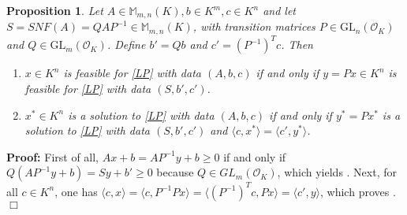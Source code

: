 \documentclass[a4paper,12pt]{article}
\newenvironment{proof}{\hbox{}\vspace{-0.8cm} {\bf Proof:}}{\hfill $\Box$}
\newtheorem{proposition}{Proposition}
\newcommand{\allmat}{\mathbb{M}} %
\newcommand{\simone}[1]{{\color{blue} #1}} %
\newcommand{\corentin}[1]{{\color{red} #1}} %
\DeclareMathOperator{\val}{val}
\newcommand{\OK}{\mathcal{O}_K}
\def\diag{\mathrm{diag}}
\newcommand{\GL}{\mathrm{GL}}
\begin{document}


\begin{proposition} \label{solsLP}
  Let $A \in \allmat_{m,n}(K), b \in K^m, c\in K^n$ and let $S = SNF(A) = QAP^{-1} \in \allmat_{m,n}(K)$, with
  transition matrices $P \in \GL_n(\OK)$ and $Q\in \GL_m(\OK)$. Define $b' = Qb$ and $c' = (P^{-1})^Tc$.
  Then
   \begin{enumerate}
   \item \label{solsLP_item1}
     $x \in K^n$ is feasible for \eqref{LP} with data $(A,b,c)$ if and only if $y = P x \in K^n$ is
     feasible for \eqref{LP} with data $(S,b',c')$.
   \item \label{solsLP_item2}
     $x^* \in K^n$ is a solution to \eqref{LP} with data $(A,b,c)$ if and only if $y^* = P x^*$ is
     a solution to \eqref{LP} with data $(S,b',c')$ and $\langle c,x^* \rangle = \langle c',y^* \rangle$.
   \end{enumerate}
\end{proposition}
\begin{proof}
  First of all, $Ax+b = AP^{-1}y +b \geq 0$ if and only if $Q(AP^{-1}y + b) = Sy + b' \geq 0$ because
  $Q \in GL_m(\OK)$, which yields . Next, for all $c \in K^n$, one has $\langle c,
  x\rangle = \langle c, P^{-1}Px \rangle = \langle \left(P^{-1}\right)^T c, Px \rangle = \langle c',y\rangle$,
  which proves .
\end{proof}
\end{document}

